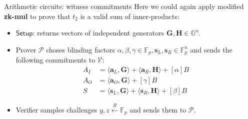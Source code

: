 \documentclass{zkdl-presentation-template}
\begin{document}
\begin{frame}{Arithmetic circuits: witness commitments}
    Here we could again apply modified \textbf{zk-mul} to prove that $t_2$ is a valid sum of inner-products:
    \begin{itemize}
        \item $\mathsf{Setup}$: returns vectors of independent generators $\mathbf{G,H} \in \mathbb{G}^n$.
        \item Prover $\mathcal{P}$ choses blinding factors $\alpha, \beta, \gamma \in \mathbb{F}_p, \mathbf{s}_L, \mathbf{s}_R \in \mathbb{F}_p^n$ and sends the following commitments to $\mathcal{V}$:
        \begin{equation*}
            \begin{aligned}
                A_I &= \langle \mathbf{a}_L, \mathbf{G} \rangle + \langle \mathbf{a}_R, \mathbf{H} \rangle + [\alpha]B\\
                A_O &= \langle \mathbf{a}_O, \mathbf{G} \rangle + [\gamma]B\\
                S &= \langle \mathbf{s}_L, \mathbf{G} \rangle + \langle \mathbf{s}_R, \mathbf{H} \rangle + [\beta]B
            \end{aligned}
        \end{equation*}
        \item Verifier samples challenges $y,z \xleftarrow{R} \mathbb{F}_p$ and sends them to $\mathcal{P}$.
    \end{itemize}
\end{frame}
\end{document}
